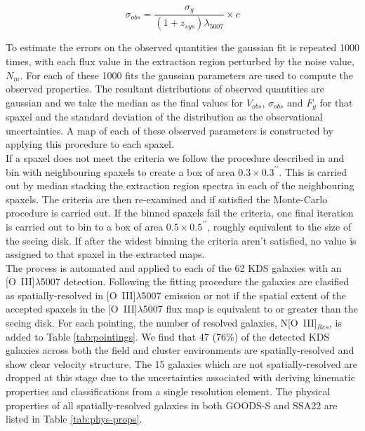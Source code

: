 \documentclass[fleqn,usenatbib]{mn2e}
\begin{document}
\begin{equation}\label{eq:dispersion_comp}
   \sigma_{obs} = \frac{\sigma_{g}}{(1 + z_{sys})\lambda_{5007}} \times c
\end{equation}

To estimate the errors on the observed quantities the gaussian fit is repeated 1000 times, with each flux value in the extraction region perturbed by the noise value, $N_{m}$.
For each of these 1000 fits the gaussian parameters are used to compute the observed properties.
The resultant distributions of observed quantities are gaussian and we take the median as the final values for $V_{obs}$, $\sigma_{obs}$ and $F_{g}$ for that spaxel and the standard deviation of the distribution as the observational uncertainties.
A map of each of these observed parameters is constructed by applying this procedure to each spaxel. \\

If a spaxel does not meet the criteria we follow the procedure described in \cite{Stott2016} and bin with neighbouring spaxels to create a box of area $0.3\times0.3^{\prime\prime}$.
This is carried out by median stacking the extraction region spectra in each of the neighbouring spaxels.
The criteria are then re-examined and if satisfied the Monte-Carlo procedure is carried out. 
If the binned spaxels fail the criteria, one final iteration is carried out to bin to a box of area $0.5\times0.5^{\prime\prime}$, roughly equivalent to the size of the seeing disk.
If after the widest binning the criteria aren't satisfied, no value is assigned to that spaxel in the extracted maps. \\

The process is automated and applied to each of the 62 KDS galaxies with an [O~{\sc III}]$\lambda$5007 detection.
Following the fitting procedure the galaxies are clasified as spatially-resolved in [O~{\sc III}]$\lambda$5007 emission or not if the spatial extent of the accepted spaxels in the [O~{\sc III}]$\lambda$5007 flux map is equivalent to or greater than the seeing disk.
For each pointing, the number of resolved galaxies, N[O~{\sc III}]$_{Res}$, is added to Table \ref{tab:pointings}.
We find that 47 (76\%) of the detected KDS galaxies across both the field and cluster environments are spatially-resolved and show clear velocity structure.
The 15 galaxies which are not spatially-resolved are dropped at this stage due to the uncertainties associated with deriving kinematic properties and classifications from a single resolution element.
The physical properties of all spatially-resolved galaxies in both GOODS-S and SSA22 are listed in Table \ref{tab:phys-props}. \\ 
\end{document}
